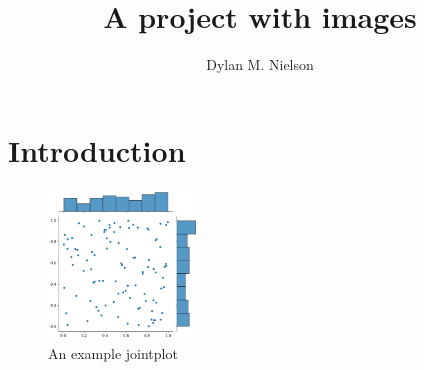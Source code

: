 \documentclass{article}
\title{A project with images}
\author{Dylan M. Nielson}
\date{}
\begin{document}
\maketitle

\section{Introduction}
\begin{figure}[htp]
    \centering
    \includegraphics[width=4cm]{fig1.jpg}
    \caption{An example jointplot}
    \label{fig:jp}
\end{figure}
\end{document}
